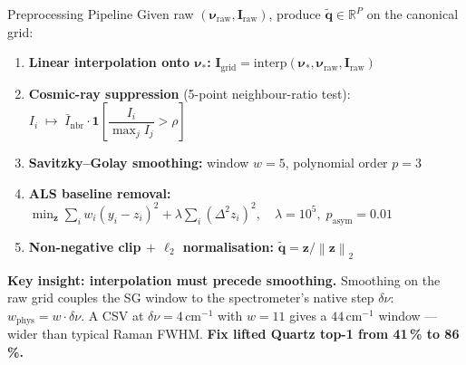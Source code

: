 \documentclass[aspectratio=169,10pt]{beamer}
\newcommand{\norm}[1]{\left\|#1\right\|}
\begin{document}
\begin{frame}{Preprocessing Pipeline}
  Given raw $(\boldsymbol{\nu}_\text{raw},\mathbf{I}_\text{raw})$,
  produce $\tilde{\mathbf{q}}\in\mathbb{R}^P$ on the canonical grid:

  \vspace{0.12cm}
  \small
  \begin{enumerate}\setlength\itemsep{0.14cm}
    \item \textbf{Linear interpolation onto $\boldsymbol{\nu}_*$:}\quad
          $\mathbf{I}_\text{grid}=\mathrm{interp}(\boldsymbol{\nu}_*,
          \boldsymbol{\nu}_\text{raw},\mathbf{I}_\text{raw})$

    \item \textbf{Cosmic-ray suppression} (5-point neighbour-ratio test):\quad
          $I_i\;\mapsto\;\bar{I}_\text{nbr}
          \cdot\mathbf{1}\!\left[\dfrac{I_i}{\max_j I_j}>\rho\right]$

    \item \textbf{Savitzky--Golay smoothing:}\quad
          window $w=5$,\; polynomial order $p=3$

    \item \textbf{ALS baseline removal:}\quad
          $\displaystyle\min_{\mathbf{z}}\sum_i w_i(y_i-z_i)^2
          +\lambda\sum_i(\Delta^2 z_i)^2,
          \quad\lambda=10^5,\;p_\text{asym}=0.01$

    \item \textbf{Non-negative clip $+$ $\ell_2$ normalisation:}\quad
          $\tilde{\mathbf{q}}=\mathbf{z}/\norm{\mathbf{z}}_2$
  \end{enumerate}

  \vspace{0.18cm}
  \begin{tcolorbox}[insightbox]
    \small\textbf{Key insight: interpolation must precede smoothing.}
    Smoothing on the raw grid couples the SG window to the spectrometer's
    native step $\delta\nu$:\; $w_\text{phys}=w\cdot\delta\nu$.
    A CSV at $\delta\nu=4\,\text{cm}^{-1}$ with $w=11$ gives a
    $44\,\text{cm}^{-1}$ window --- wider than typical Raman FWHM.
    \textbf{Fix lifted Quartz top-1 from 41\,\% to 86\,\%.}
  \end{tcolorbox}
\end{frame}
\end{document}
